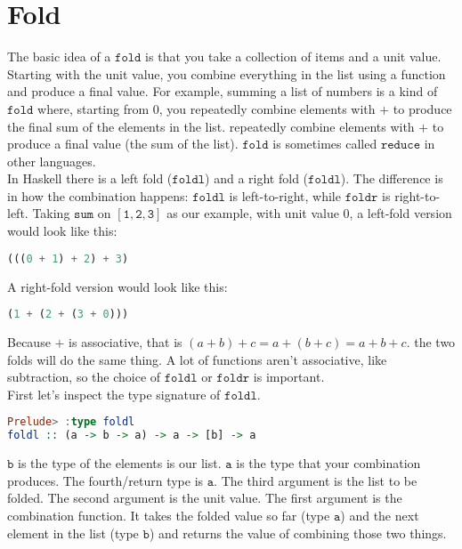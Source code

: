 \documentclass[a4paper,12pt]{article}
\newcommand{\kwa}[1]{\mathtt{#1}}
\begin{document}
\section{Fold}

\noindent
The basic idea of a $\kwa{fold}$ is that you take a collection of items and a unit value. Starting with the unit value, you combine everything in the list using a function and produce a final value. For example, summing a list of numbers is a kind of $\kwa{fold}$ where, starting from 0, you repeatedly combine elements with $+$ to produce the final sum of the elements in the list. repeatedly combine elements with $+$ to produce a final value (the sum of the list). $\kwa{fold}$ is sometimes called $\kwa{reduce}$ in other languages. \\

\noindent
In Haskell there is a left fold ($\kwa{foldl}$) and a right fold ($\kwa{foldl}$). The difference is in how the combination happens: $\kwa{foldl}$ is left-to-right, while $\kwa{foldr}$ is right-to-left. Taking $\kwa{sum}$ on $\kwa{[1,2,3]}$ as our example, with unit value 0, a left-fold version would look like this:

\noindent
\begin{lstlisting}[language=Haskell]
(((0 + 1) + 2) + 3)
\end{lstlisting}

\noindent
A right-fold version would look like this:

\noindent
\begin{lstlisting}[language=Haskell]
(1 + (2 + (3 + 0)))
\end{lstlisting}

\noindent
Because $+$ is associative, that is $(a + b) + c = a + (b + c) = a + b + c$. the two folds will do the same thing. A lot of functions aren't associative, like subtraction, so the choice of $\kwa{foldl}$ or $\kwa{foldr}$ is important. \\

\noindent
First let's inspect the type signature of $\kwa{foldl}$.

\begin{lstlisting}[language=Haskell]
Prelude> :type foldl
foldl :: (a -> b -> a) -> a -> [b] -> a
\end{lstlisting}

\noindent
$\kwa{b}$ is the type of the elements is our list. $\kwa{a}$ is the type that your combination produces. The fourth/return type is $\kwa{a}$. The third argument is the list to be folded. The second argument is the unit value. The first argument is the combination function. It takes the folded value so far (type $\kwa{a}$) and the next element in the list (type $\kwa{b}$) and returns the value of combining those two things. \\
\end{document}
